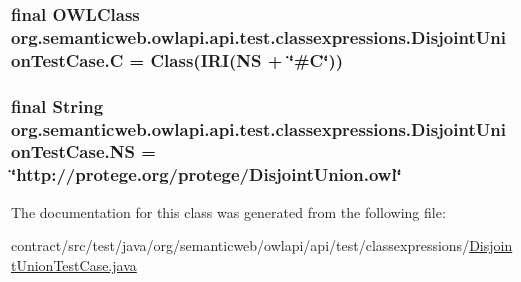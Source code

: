 \hypertarget{classorg_1_1semanticweb_1_1owlapi_1_1api_1_1test_1_1classexpressions_1_1_disjoint_union_test_case_a740f2123391b1d187af38b61b8603a7c}{
\subsubsection[{C}]{\setlength{\rightskip}{0pt plus 5cm}final {\bf O\-W\-L\-Class} org.\-semanticweb.\-owlapi.\-api.\-test.\-classexpressions.\-Disjoint\-Union\-Test\-Case.\-C = Class({\bf I\-R\-I}({\bf N\-S} + \char`\"{}\#C\char`\"{}))\hspace{0.3cm}{\ttfamily [static]}}}\label{classorg_1_1semanticweb_1_1owlapi_1_1api_1_1test_1_1classexpressions_1_1_disjoint_union_test_case_a740f2123391b1d187af38b61b8603a7c}
\hypertarget{classorg_1_1semanticweb_1_1owlapi_1_1api_1_1test_1_1classexpressions_1_1_disjoint_union_test_case_a79a7a9269e9b8149e52422c16ca161f7}{
\subsubsection[{N\-S}]{\setlength{\rightskip}{0pt plus 5cm}final String org.\-semanticweb.\-owlapi.\-api.\-test.\-classexpressions.\-Disjoint\-Union\-Test\-Case.\-N\-S = \char`\"{}http\-://protege.\-org/protege/Disjoint\-Union.\-owl\char`\"{}\hspace{0.3cm}{\ttfamily [static]}}}\label{classorg_1_1semanticweb_1_1owlapi_1_1api_1_1test_1_1classexpressions_1_1_disjoint_union_test_case_a79a7a9269e9b8149e52422c16ca161f7}


The documentation for this class was generated from the following file\-:\begin{DoxyCompactItemize}
\item 
contract/src/test/java/org/semanticweb/owlapi/api/test/classexpressions/\hyperlink{_disjoint_union_test_case_8java}{Disjoint\-Union\-Test\-Case.\-java}\end{DoxyCompactItemize}
